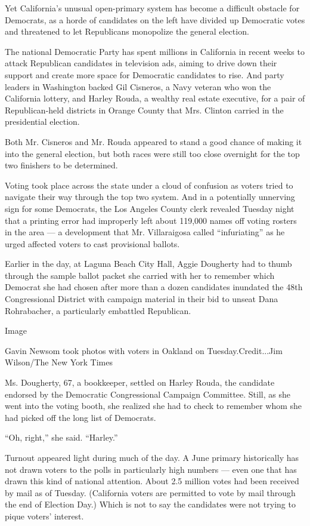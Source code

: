 Yet California's unusual open-primary system has become a difficult
obstacle for Democrats, as a horde of candidates on the left have
divided up Democratic votes and threatened to let Republicans monopolize
the general election.

The national Democratic Party has spent millions in California in recent
weeks to attack Republican candidates in television ads, aiming to drive
down their support and create more space for Democratic candidates to
rise. And party leaders in Washington backed Gil Cisneros, a Navy
veteran who won the California lottery, and Harley Rouda, a wealthy real
estate executive, for a pair of Republican-held districts in Orange
County that Mrs. Clinton carried in the presidential election.

Both Mr. Cisneros and Mr. Rouda appeared to stand a good chance of
making it into the general election, but both races were still too close
overnight for the top two finishers to be determined.

Voting took place across the state under a cloud of confusion as voters
tried to navigate their way through the top two system. And in a
potentially unnerving sign for some Democrats, the Los Angeles County
clerk revealed Tuesday night that a printing error had improperly left
about 119,000 names off voting rosters in the area --- a development
that Mr. Villaraigosa called ``infuriating'' as he urged affected voters
to cast provisional ballots.

Earlier in the day, at Laguna Beach City Hall, Aggie Dougherty had to
thumb through the sample ballot packet she carried with her to remember
which Democrat she had chosen after more than a dozen candidates
inundated the 48th Congressional District with campaign material in
their bid to unseat Dana Rohrabacher, a particularly embattled
Republican.

Image

Gavin Newsom took photos with voters in Oakland on Tuesday.Credit...Jim
Wilson/The New York Times

Ms. Dougherty, 67, a bookkeeper, settled on Harley Rouda, the candidate
endorsed by the Democratic Congressional Campaign Committee. Still, as
she went into the voting booth, she realized she had to check to
remember whom she had picked off the long list of Democrats.

``Oh, right,'' she said. ``Harley.''

Turnout appeared light during much of the day. A June primary
historically has not drawn voters to the polls in particularly high
numbers --- even one that has drawn this kind of national attention.
About 2.5 million votes had been received by mail as of Tuesday.
(California voters are permitted to vote by mail through the end of
Election Day.) Which is not to say the candidates were not trying to
pique voters' interest.

